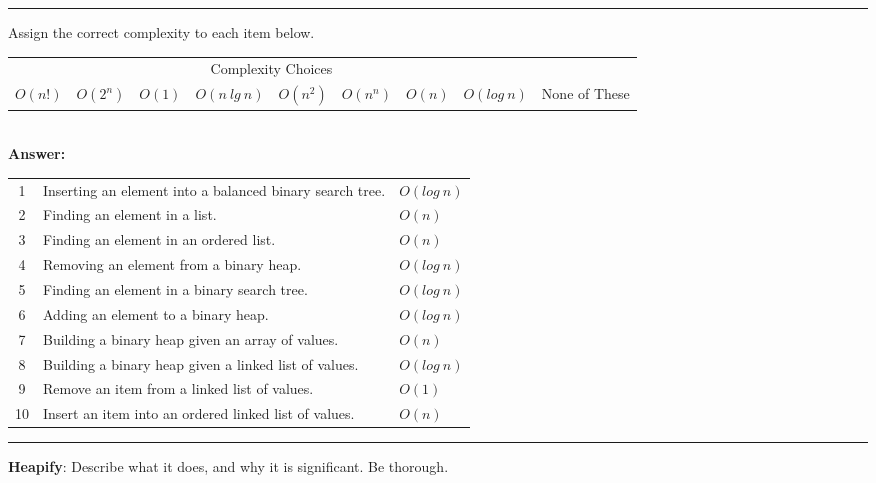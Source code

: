 \documentclass[12pt]{exam}
\newcommand{\ans}[1]{\textcolor{dgreen}{#1}}
\newcommand{\ansbox}[1]{
\textcolor{dgreen}{\textbf{Answer:}}\\
\noindent\colorbox[gray]{0.90}{%
    \parbox{\textwidth - 12 \fboxsep}{\ans{#1}}%
}}
\newcommand{\seperate}{\begin{center}\noindent\rule{18cm}{0.75pt}\end{center}}
\begin{document}
\begin{questions}
    \seperate
\clearpage
    \question[20]Assign the correct complexity to each item below.

    \begin{tabular}{ c  c  c  c  c  c  c  c c }
        \multicolumn{8}{c}{Complexity Choices} \\
        $O(n!)$ & $O(2^n)$ & $O(1)$ & $O(n\ lg\ n)$ & $O(n^2)$ & $O(n^n)$ & $O(n)$ & $O(log\ n)$ & None of These \\
    \end{tabular}
    \\
    \ansbox{
    \begin{tabular}{ c  l  l}
        1  & Inserting an element into a balanced binary search tree. & $O(log\ n)$ \\
        2  & Finding an element in a list.                            & $O(n)$      \\
        3  & Finding an element in an ordered list.                   & $O(n)$      \\
        4  & Removing an element from a binary heap.                  & $O(log\ n)$ \\
        5  & Finding an element in a binary search tree.              & $O(log\ n)$ \\
        6  & Adding an element to a binary heap.                      & $O(log\ n)$ \\
        7  & Building a binary heap given an array of values.         & $O(n)$      \\
        8  & Building a binary heap given a linked list of values.    & $O(log\ n)$ \\
        9  & Remove an item from a linked list of values.             & $O(1)$      \\
        10 & Insert an item into an ordered linked list of values.    & $O(n)$      \\
    \end{tabular}
    }
    \seperate

    \question[10] \textbf{Heapify}: Describe what it does, and why it is significant. Be thorough.


\end{questions}
\end{document}
